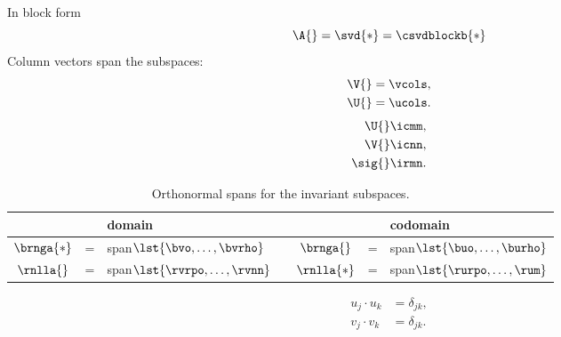 In block form
  \begin{equation*}   %
    \A{} = \svd{*} = \csvdblockb{*}
    \label{eq:svd block}
  \end{equation*}
Column vectors span the subspaces:
  \begin{equation*}   %
  \begin{split}
    \V{} &= \vcols,	\\
    \U{} &= \ucols.
  \end{split}
  \end{equation*}
  \begin{equation*}   %
  \begin{split}
    \U{} & \icmm , \\
    \V{} & \icnn , \\
    \sig{} & \irmn.
  \end{split}
  \end{equation*}
  \begin{table}[htbp]  %
    \caption{Orthonormal spans for the invariant subspaces.}
    \begin{center}
      \begin{tabular}{cclcccl}
        && domain &&&& codomain \\\hline
        $\brnga{*}$ &=& span$\lst{\bvo, \dots, \bvrho}$ & \qquad &
        $\brnga{}$  &=& span$\lst{\buo, \dots, \burho}$ \\
        $\rnlla{}$  &=& span$\lst{\rvrpo, \dots, \rvnn}$ &&
        $\rnlla{*}$ &=& span$\lst{\rurpo, \dots, \rum}$ \\
      \end{tabular}
    \end{center}
  \end{table}%
  
  \begin{equation*}   %
  \begin{split}
    u_{j} \cdot u_{k} &= \delta_{jk}, \\
    v_{j} \cdot v_{k} &= \delta_{jk}.
  \end{split}
  \end{equation*}

